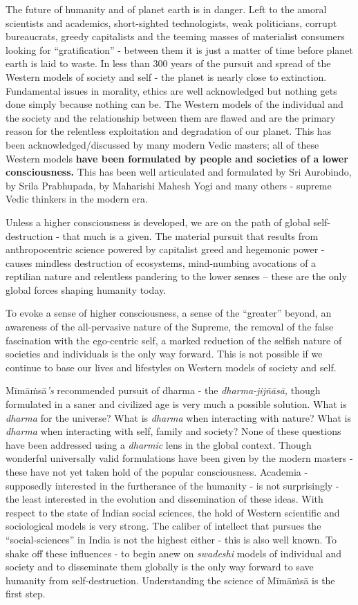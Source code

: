 The future of humanity and of planet earth is in danger. Left to the amoral scientists and academics, short-sighted technologists, weak politicians, corrupt bureaucrats, greedy capitalists and the teeming masses of materialist consumers looking for “gratification” - between them it is just a matter of time before planet earth is laid to waste. In less than 300 years of the pursuit and spread of the Western models of society and self - the planet is nearly close to extinction. Fundamental issues in morality, ethics are well acknowledged but nothing gets done simply because nothing can be. The Western models of the individual and the society and the relationship between them are flawed and are the primary reason for the relentless exploitation and degradation of our planet. This has been acknowledged/discussed by many modern Vedic masters; all of these Western models \textbf{have been formulated by people and societies of a lower consciousness.} This has been well articulated and formulated by Sri Aurobindo, by Srila Prabhupada, by Maharishi Mahesh Yogi and many others - supreme Vedic thinkers in the modern era.

Unless a higher consciousness is developed, we are on the path of global self-destruction - that much is a given. The material pursuit that results from anthropocentric science powered by capitalist greed and hegemonic power - causes mindless destruction of ecosystems, mind-numbing avocations of a reptilian nature and relentless pandering to the lower senses – these are the only global forces shaping humanity today.

To evoke a sense of higher consciousness, a sense of the “greater” beyond, an awareness of the all-pervasive nature of the Supreme, the removal of the false fascination with the ego-centric self, a marked reduction of the selfish nature of societies and individuals is the only way forward. This is not possible if we continue to base our lives and lifestyles on Western models of society and self.

Mīmāṁsā\textit{’s} recommended pursuit of dharma - the \textit{dharma-jijñāsā,} though formulated in a saner and civilized age is very much a possible solution. What is \textit{dharma} for the universe? What is \textit{dharma} when interacting with nature? What is \textit{dharma} when interacting with self, family and society? None of these questions have been addressed using a \textit{dharmic} lens in the global context. Though wonderful universally valid formulations have been given by the modern masters - these have not yet taken hold of the popular consciousness. Academia - supposedly interested in the furtherance of the humanity - is not surprisingly - the least interested in the evolution and dissemination of these ideas. With respect to the state of Indian social sciences, the hold of Western scientific and sociological models is very strong. The caliber of intellect that pursues the “social-sciences” in India is not the highest either - this is also well known. To shake off these influences - to begin anew on \textit{swadeshi} models of individual and society and to disseminate them globally is the only way forward to save humanity from self-destruction. Understanding the science of Mīmāṁsā is the first step.

